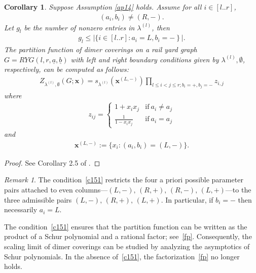 \documentclass[11pt]{amsart}
\theoremstyle{plain}
\newtheorem{corollary}[theorem]{Corollary}
\theoremstyle{definition}
\theoremstyle{remark}
\newtheorem{remark}[theorem]{Remark}
\numberwithin{equation}{section}
\numberwithin{theorem}{section}
\numberwithin{figure}{section}
\begin{document}
\begin{corollary}\label{lc13}Suppose Assumption \ref{ap14} holds.
Assume for all
$i\in[l..r]$,
\begin{eqnarray}
(a_i,b_i)\neq (R,-).\label{c151}
\end{eqnarray}
Let $g_l$ be the number of nonzero entries in $\lambda^{(l)}$, then
\begin{eqnarray}
g_l\leq \left|\{i\in[l..r]:a_i=L,b_i=-\right\}|.\label{glu}
\end{eqnarray}
The partition function of dimer coverings on a rail yard graph $G=RYG(l,r,\underline{a},\underline{b})$ with left and right boundary conditions given by $\lambda^{(l)},\emptyset$, respectively,  can be computed as follows:
\begin{eqnarray}
Z_{\lambda^{(l)},\emptyset}(G;\mathbf{x})=s_{\lambda^{(l)}}\left(\mathbf{x}^{(L,-)}\right)\prod_{l\leq i<j\leq r;b_i=+,b_j=-}z_{i,j}\label{fp}
\end{eqnarray}
where
\begin{eqnarray}
z_{ij}=\begin{cases}1+x_ix_j&\mathrm{if}\ a_i\neq a_j\\\frac{1}{1-x_ix_j}&\mathrm{if}\ a_i=a_j\end{cases}\label{dzij}
\end{eqnarray}
and
\begin{eqnarray*}
\mathbf{x}^{(L,-)}:=\{x_i: (a_i,b_i)=(L,-)\}.
\end{eqnarray*}
\end{corollary}

\begin{proof}See Corollary 2.5 of \cite{Li21}.
\end{proof}

\begin{remark}The condition~\ref{c151} restricts the four a priori possible parameter pairs
attached to even columns—\((L,-),\,(R,+),\,(R,-),\,(L,+)\)—to the three
admissible pairs \((L,-),\,(R,+),\,(L,+)\). In particular, if \(b_i=-\) then
necessarily \(a_i=L\).


The condition~\ref{c151} ensures that the partition function can be written as
the product of a Schur polynomial and a rational factor; see~\eqref{fp}.
Consequently, the scaling limit of dimer coverings can be studied by analyzing
the asymptotics of Schur polynomials. In the absence of~\ref{c151}, the
factorization~\eqref{fp} no longer holds.
\end{remark}
\end{document}
